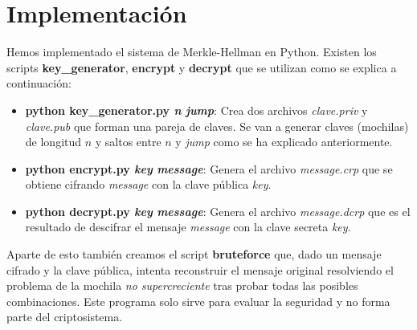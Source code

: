 \documentclass[12pt]{article}
\begin{document}
\section{Implementación}

Hemos implementado el sistema de Merkle-Hellman en Python. Existen los scripts \textbf{key\_generator}, \textbf{encrypt} y \textbf{decrypt} que se utilizan como se explica a continuación:

\begin{itemize}
	\item \textbf{python key\_generator.py \textit{n} \textit{jump}}: Crea dos archivos \textit{clave.priv} y \textit{clave.pub} que forman una pareja de claves. Se van a generar claves (mochilas) de longitud $n$ y saltos entre $n$ y \textit{jump} como se ha explicado anteriormente.
	\item \textbf{python encrypt.py \textit{key} \textit{message}}: Genera el archivo \textit{message.crp} que se obtiene cifrando \textit{message} con la clave pública \textit{key}.
	\item \textbf{python decrypt.py \textit{key} \textit{message}}: Genera el archivo \textit{message.dcrp} que es el resultado de descifrar el mensaje \textit{message} con la clave secreta \textit{key}.
\end{itemize}
Aparte de esto también creamos el script \textbf{bruteforce} que, dado un mensaje cifrado y la clave pública, intenta reconstruir el mensaje original resolviendo el problema de la mochila \emph{no supercreciente} tras probar todas las posibles combinaciones. Este programa solo sirve para evaluar la seguridad y no forma parte del criptosistema.





 
\end{document}
